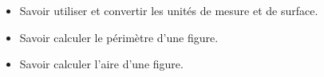 \begin{myobj}
	\begin{itemize}
		
		\item Savoir utiliser et convertir les unités de mesure et de surface.
		\item Savoir calculer le périmètre d'une figure.
		\item Savoir calculer l'aire d'une figure.
		
			
	\end{itemize}
\end{myobj}

%
%		


